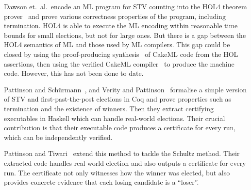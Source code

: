 \documentclass{llncs}
\begin{document}
Dawson et.\ al.\ encode an ML program for STV counting into the HOL4
theorem prover~\cite{DBLP:conf/voteid/DawsonGM15} and prove various
correctness properties of the program, including termination. HOL4 is
able to execute the ML encoding within reasonable time bounds for
small elections, but not for large ones. But there is a gap between
the HOL4 semantics of ML and those used by ML compilers. This gap
could be closed by using the proof-producing synthesis~\cite{Myreen}
of CakeML code from the HOL assertions, then using the verified
CakeML compiler~\cite{POPL14} to produce the machine code. However, this
has not been done to date. 

Pattinson and Sch\"urmann~\cite{DBLP:conf/ausai/PattinsonS15}, and
Verity and Pattinson~\cite{DBLP:conf/acsw/VerityP17} formalise a
simple version of STV and first-past-the-post elections in Coq and
prove properties such as termination and the existence of winners.
Then they extract certifying executables in Haskell which can handle
real-world elections. Their crucial contribution is that their
executable code produces a certificate for every run, which can be
independently verified. 

Pattinson and Tiwari~\cite{DBLP:conf/itp/PattinsonT17} extend this
method to tackle the Schultz method.  Their extracted code handles
real-world election and also outputs a certificate for every run.
The certificate not only witnesses how the winner was elected, but also
provides concrete evidence that each losing candidate is a ``loser''.

\end{document}
